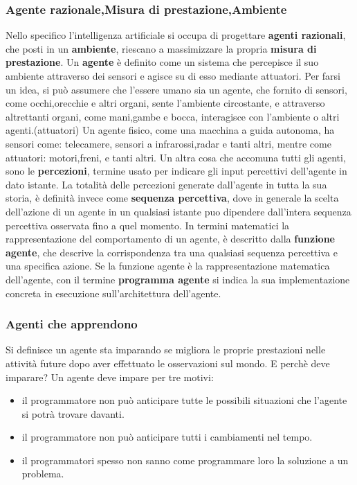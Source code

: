 \documentclass[14pt]{extarticle}
\begin{document}
\subsubsection{Agente razionale,Misura di prestazione,Ambiente}

Nello specifico l'intelligenza artificiale si occupa di progettare \textbf{agenti razionali}, che posti in un \textbf{ambiente}, riescano a massimizzare la propria \textbf{misura di prestazione}.\cite{russell2005intelligenza}
Un \textbf{agente} è definito  come un sistema che percepisce il suo ambiente attraverso dei sensori e agisce su di esso mediante attuatori. Per farsi un idea, si può assumere che l'essere umano sia un agente, che fornito di sensori, come occhi,orecchie e altri organi, sente l'ambiente circostante, e attraverso altrettanti organi, come mani,gambe e bocca, interagisce con l'ambiente o altri agenti.(attuatori)
Un agente fisico, come una macchina a guida autonoma, ha sensori come: telecamere, sensori a infrarossi,radar e tanti altri, mentre come attuatori: motori,freni, e tanti altri. 
Un altra cosa che accomuna tutti gli agenti, sono le  \textbf{percezioni}, termine usato per indicare gli input percettivi dell'agente in dato istante.\cite{russell2005intelligenza}
La totalità delle percezioni generate dall'agente in tutta la sua storia, è definità invece come \textbf{sequenza percettiva}, dove in generale la scelta dell'azione di un agente in un qualsiasi istante puo dipendere dall'intera sequenza percettiva osservata fino a quel momento.
In termini matematici la rappresentazione del comportamento di un agente, è descritto dalla \textbf{funzione agente}, che descrive la corrispondenza tra una qualsiasi sequenza percettiva e una specifica azione.
Se la funzione agente è la rappresentazione matematica dell'agente, con il termine \textbf{programma agente} si indica la sua implementazione concreta  in  esecuzione sull'architettura dell'agente.  \cite{russell2005intelligenza}
\subsubsection{Agenti che apprendono}
Si definisce un agente sta imparando se migliora le proprie prestazioni nelle attività future dopo aver effettuato le osservazioni
sul mondo. \cite{russell2005intelligenza}
E perchè deve imparare?
Un agente deve impare per tre motivi:
\begin{itemize}
\item  il programmatore non può anticipare tutte le possibili situazioni che l'agente si potrà trovare davanti.
\item il programmatore non può anticipare tutti i cambiamenti nel tempo.
\item il programmatori spesso non sanno come programmare loro la soluzione a un problema.
\end{itemize}\cite{russell2005intelligenza}
\end{document}
